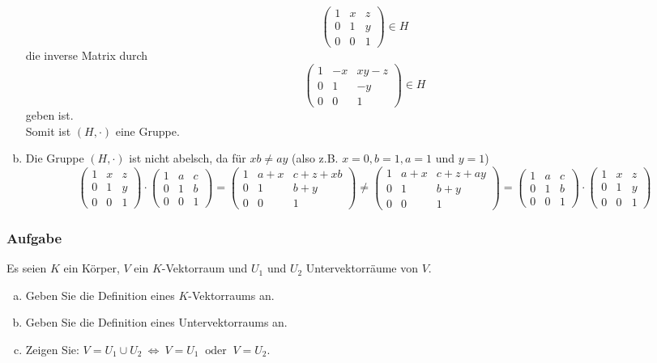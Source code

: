 \documentclass[a4paper,11pt]{scrartcl}
\newcounter{auf}
\newcommand{\Aufgabe}%
        {\addtocounter{auf}{1} \subsubsection*{\rmfamily  Aufgabe \theauf \hspace{1em}} }
\begin{document}
\begin{enumerate}[a)]
$$
 \begin{pmatrix} 1&x&z\\0&1&y\\0&0&1 \end{pmatrix} \in H
$$
die inverse Matrix durch
$$
 \begin{pmatrix} 1&-x&xy-z\\0&1&-y\\0&0&1 \end{pmatrix} \in H
$$
geben ist.\\
Somit ist $(H,\cdot)$ eine Gruppe.
\item Die Gruppe $(H,\cdot)$ ist nicht abelsch, da für $xb\ne ay$ (also z.B. $x=0,b=1,a=1$ und $y=1$)
$$
\begin{pmatrix} 1&x&z\\0&1&y\\0&0&1 \end{pmatrix} \cdot \begin{pmatrix} 1&a&c\\0&1&b\\0&0&1 \end{pmatrix} =\begin{pmatrix} 1&a+x&c+z+xb\\0&1&b+y\\0&0&1 \end{pmatrix}\ne \begin{pmatrix} 1&a+x&c+z+ay\\0&1&b+y\\0&0&1 \end{pmatrix}=\begin{pmatrix} 1&a&c\\0&1&b\\0&0&1 \end{pmatrix}\cdot \begin{pmatrix} 1&x&z\\0&1&y\\0&0&1 \end{pmatrix} 
$$
\end{enumerate}

\newpage
\Aufgabe

Es seien $K$ ein Körper, $V$ ein $K$-Vektorraum und $U_1$ und $U_2$
Untervektorräume von $V.$

\begin{enumerate}[a)]
\item Geben Sie die Definition eines $K$-Vektorraums an.
\item Geben Sie die Definition eines Untervektorraums an.
\item Zeigen Sie: $V=U_1\cup U_2  \ \Longleftrightarrow \ V=U_1\ \text{ oder }\ V=U_2.$
\end{enumerate}
%
%
\end{document}
